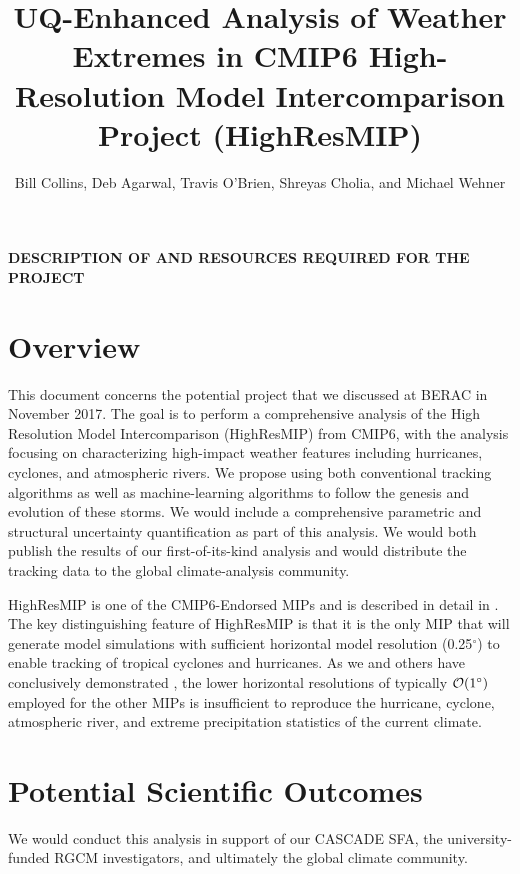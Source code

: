 \documentclass[11pt]{article}
\title{UQ-Enhanced Analysis of Weather Extremes in CMIP6 High-Resolution Model Intercomparison Project (HighResMIP)}
\author{Bill Collins, Deb Agarwal, Travis O'Brien, Shreyas Cholia, and Michael Wehner
}
\newcommand{\tbd}[1]{\ifthenelse{\boolean{draft}}{{\color{red} #1}}{}}
\begin{document}
\pagestyle{fancy} %

\maketitle
\onecolumn
\begin{center}
\textbf{DESCRIPTION OF AND RESOURCES REQUIRED FOR THE PROJECT}
\end{center}
\section{Overview}
\label{sec:Overview}
This document concerns the potential project that we discussed at BERAC in November 2017.   The goal is to perform a comprehensive analysis of the High Resolution Model Intercomparison (HighResMIP) from CMIP6, with the analysis focusing on characterizing high-impact weather features including hurricanes, cyclones, and atmospheric rivers.  We propose using both conventional tracking algorithms as well as machine-learning algorithms to follow the genesis and evolution of these storms.  We would include a comprehensive parametric and structural uncertainty quantification as part of this analysis.
We would both publish the results of our first-of-its-kind analysis and would distribute the tracking data to the global climate-analysis community.

HighResMIP %
is one of the CMIP6-Endorsed MIPs \cite{Eyring16}
and is described in detail in \cite{Haarsma16}. The key distinguishing feature of HighResMIP is that it is the only MIP that will generate model simulations with sufficient horizontal model resolution (0.25${}^\circ$) to enable tracking of tropical cyclones and hurricanes.  As we and others have conclusively demonstrated \cite{Wehner15,Wehner14,Wehner10}, the lower horizontal resolutions of typically ${\cal O}(1^\circ)$ employed for the other MIPs is insufficient to reproduce the hurricane, cyclone, atmospheric river, and extreme precipitation statistics of the current climate.

\section{Potential Scientific Outcomes}
\label{sec:outcomes}
We would conduct this analysis in support of our CASCADE SFA, the university-funded RGCM investigators, and ultimately the global climate community.
\end{document}
